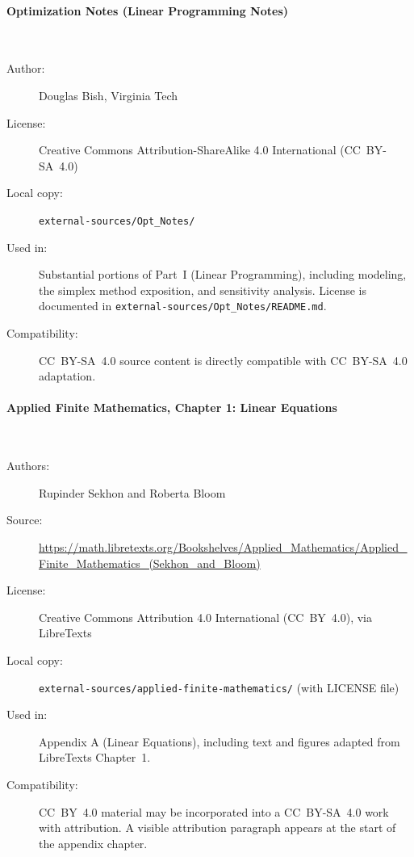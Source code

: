 \paragraph{Optimization Notes (Linear Programming Notes)}\hspace{0pt}\\[-0.6em]
\begin{description}
  \item[Author:] Douglas Bish, Virginia Tech
  \item[License:] Creative Commons Attribution-ShareAlike 4.0
    International (CC~BY-SA~4.0)
  \item[Local copy:] \texttt{external-sources/Opt\_Notes/}
  \item[Used in:] Substantial portions of Part~I (Linear Programming),
    including modeling, the simplex method exposition, and sensitivity
    analysis. License is documented in
    \texttt{external-sources/Opt\_Notes/README.md}.
  \item[Compatibility:] CC~BY-SA~4.0 source content is directly
    compatible with CC~BY-SA~4.0 adaptation.
\end{description}

\paragraph{Applied Finite Mathematics, Chapter 1: Linear Equations}\hspace{0pt}\\[-0.6em]
\begin{description}
  \item[Authors:] Rupinder Sekhon and Roberta Bloom
  \item[Source:] \url{https://math.libretexts.org/Bookshelves/Applied_Mathematics/Applied_Finite_Mathematics_(Sekhon_and_Bloom)}
  \item[License:] Creative Commons Attribution 4.0 International
    (CC~BY~4.0), via LibreTexts
  \item[Local copy:] \texttt{external-sources/applied-finite-mathematics/}
    (with LICENSE file)
  \item[Used in:] Appendix A (Linear Equations), including text and
    figures adapted from LibreTexts Chapter~1.
  \item[Compatibility:] CC~BY~4.0 material may be incorporated into a
    CC~BY-SA~4.0 work with attribution. A visible attribution paragraph
    appears at the start of the appendix chapter.
\end{description}

